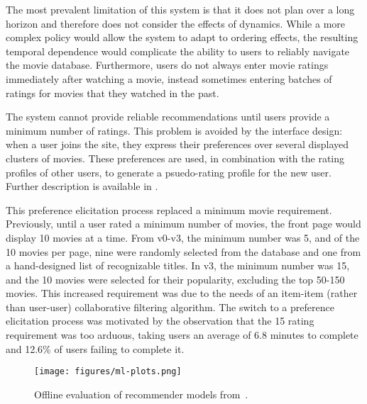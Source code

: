 \documentclass[12pt, a4paper, twocolumn]{article}
\begin{document}
{}{%
The most prevalent limitation of this system is that it does not plan over a long horizon and therefore does not consider the effects of dynamics.
While a more complex policy would allow the system to adapt to ordering effects,
the resulting temporal dependence would complicate the ability to users to reliably navigate the movie database.
Furthermore, users do not always enter movie ratings immediately after watching a movie, instead sometimes entering batches of ratings for movies that they watched in the past.
}{%
The system cannot provide reliable recommendations until users provide a minimum number of ratings. 
This problem is avoided by the interface design: when a user joins the site, they express their preferences over several displayed clusters of movies. These preferences are used, in combination with the rating profiles of other users, to generate a psuedo-rating profile for the new user. Further description is available in \cite{chang2015using}.

This preference elicitation process replaced a minimum movie requirement.
Previously, until a user rated a minimum number of movies, the front page would display 10 movies at a time.
From v0-v3, the minimum number was 5, and of the 10 movies per page,
nine were randomly selected from the database and one from a hand-designed list of recognizable titles.
In v3, the minimum number was 15, and the 10 movies were selected for their popularity, excluding the top 50-150 movies. This increased requirement was due to the needs of an item-item (rather than user-user) collaborative filtering algorithm.
The switch to a preference elicitation process was motivated by the observation that the 15 rating requirement was too arduous, taking users an average of 6.8 minutes to complete and 12.6\% of users failing to complete it.

}

\begin{figure*}[t]
\begin{center}

    \texttt{[image: figures/ml-plots.png]}
        
\end{center}
    \caption{%
        Offline evaluation of recommender models from~\cite{ekstrand2015letting}.
    }\label{fig:eval}
\end{figure*}

\end{document}
